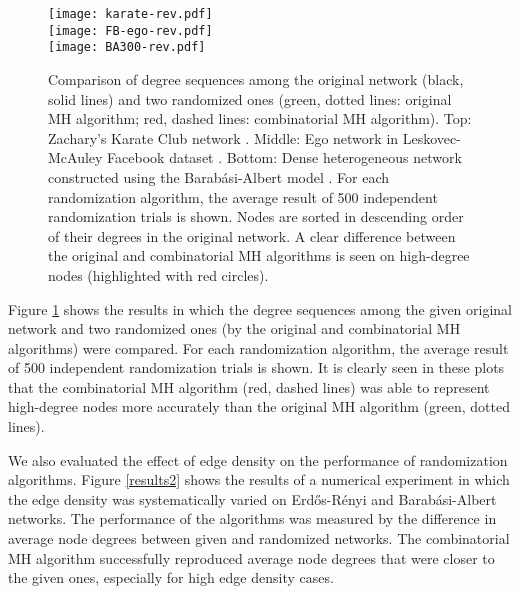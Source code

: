 \documentclass{llncs}
\begin{document}
\begin{figure}
\centering
\texttt{[image: karate-rev.pdf]}\\
\texttt{[image: FB-ego-rev.pdf]}\\
\texttt{[image: BA300-rev.pdf]}
\caption{Comparison of degree sequences among the original network
  (black, solid lines) and two randomized ones (green, dotted lines:
  original MH algorithm; red, dashed lines: combinatorial MH
  algorithm). Top: Zachary's Karate Club network
  \cite{zachary1977information}. Middle: Ego network in
  Leskovec-McAuley Facebook dataset
  \cite{leskovec2012learning}. Bottom: Dense heterogeneous network
  constructed using the Barab\'{a}si-Albert model
  \cite{barabasi1999emergence}. For each randomization algorithm, the
  average result of 500 independent randomization trials is
  shown. Nodes are sorted in descending order of their degrees in the
  original network. A clear difference between the original and
  combinatorial MH algorithms is seen on high-degree nodes
  (highlighted with red circles).}
\label{results1}
\end{figure}

Figure \ref{results1} shows the results in which the degree sequences
among the given original network and two randomized ones (by the
original and combinatorial MH algorithms) were compared. For each
randomization algorithm, the average result of 500 independent
randomization trials is shown. It is clearly seen in these plots that
the combinatorial MH algorithm (red, dashed lines) was able to
represent high-degree nodes more accurately than the original MH
algorithm (green, dotted lines).

We also evaluated the effect of edge density on the performance of
randomization algorithms. Figure \ref{results2} shows the results of a
numerical experiment in which the edge density was systematically
varied on Erd\H{o}s-R\'enyi and Barab\'{a}si-Albert networks. The
performance of the algorithms was measured by the difference in
average node degrees between given and randomized networks. The
combinatorial MH algorithm successfully reproduced average node
degrees that were closer to the given ones, especially for high edge
density cases.
\end{document}
